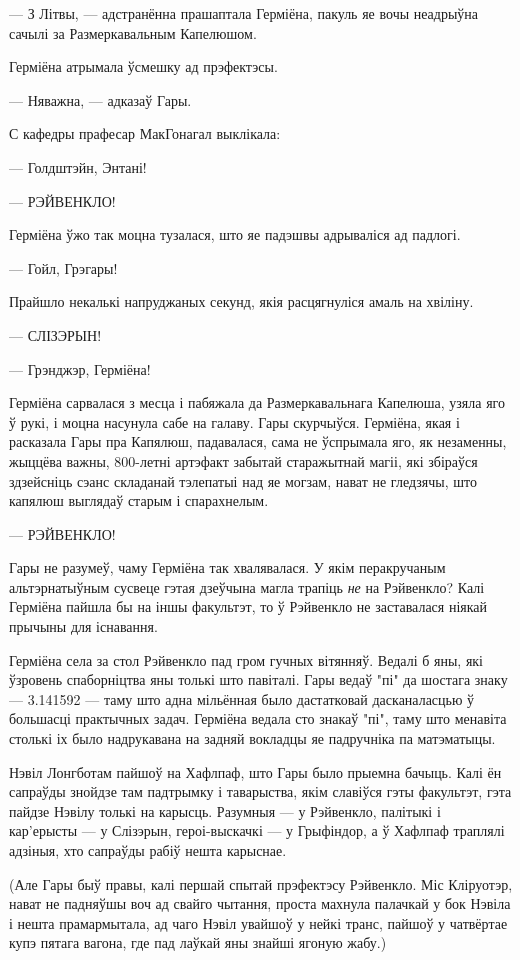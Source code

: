--- З Літвы, --- адстранённа прашаптала Герміёна, пакуль яе вочы неадрыўна сачылі за
Размеркавальным Капелюшом. 

Герміёна атрымала ўсмешку ад прэфектэсы.

--- Няважна, --- адказаў Гары.

С кафедры прафесар МакГонагал выклікала:

--- Голдштэйн, Энтані!

--- РЭЙВЕНКЛО!

Герміёна ўжо так моцна тузалася, што яе падэшвы адрываліся ад падлогі.

--- Гойл, Грэгары!

Прайшло некалькі напруджаных секунд, якія расцягнуліся амаль на хвіліну. 

--- СЛІЗЭРЫН!

--- Грэнджэр, Герміёна!

Герміёна сарвалася з месца і пабяжала да Размеркавальнага Капелюша, узяла яго ў рукі,
і моцна насунула сабе на галаву. Гары скурчыўся. Герміёна, якая і расказала Гары пра 
Капялюш, падавалася, сама не ўспрымала яго, як незаменны,
жыццёва важны, 800-летні артэфакт забытай старажытнай магіі, які збіраўся
здзейсніць сэанс складанай тэлепатыі над яе могзам, нават не гледзячы, што капялюш 
выглядаў старым і спарахнелым.  

--- РЭЙВЕНКЛО!

Гары не разумеў, чаму Герміёна так хвалявалася. У якім перакручаным альтэрнатыўным
сусвеце гэтая дзеўчына магла трапіць \emph{не} на Рэйвенкло? Калі Герміёна пайшла бы 
на іншы факультэт, то ў Рэйвенкло не заставалася ніякай прычыны для існавання.

Герміёна села за стол Рэйвенкло пад гром гучных вітянняў. Ведалі б яны, які 
ўзровень спаборніцтва яны толькі што павіталі. Гары ведаў "пі" да шостага знаку
--- 3.141592 --- таму што адна мільённая было дастатковай дасканаласцью ў большасці
практычных задач. Герміёна ведала сто знакаў "пі", таму што менавіта столькі іх было 
надрукавана на задняй вокладцы яе падручніка па матэматыцы.

Нэвіл Лонгботам пайшоў на Хафлпаф, што Гары было прыемна бачыць. Калі ён сапраўды 
знойдзе там падтрымку і таварыства, якім славіўся гэты факультэт, гэта
пайдзе Нэвілу толькі на карысць.
Разумныя --- у Рэйвенкло, палітыкі і кар'ерысты --- у Слізэрын, героі-выскачкі --- у
Грыфіндор, а ў Хафлпаф траплялі адзіныя, хто сапраўды рабіў нешта карыснае.

(Але Гары быў правы, калі першай спытай прэфектэсу Рэйвенкло. Міс Кліруотэр, нават
не падняўшы воч ад свайго чытання, проста махнула
палачкай у бок Нэвіла і нешта прамармытала, ад чаго Нэвіл увайшоў у нейкі транс,
пайшоў у чатвёртае купэ  пятага вагона, где пад лаўкай яны знайші ягоную жабу.)

